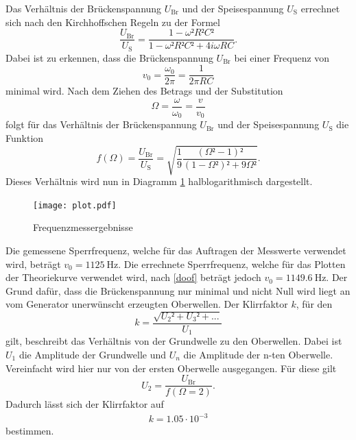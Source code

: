 Das Verhältnis der Brückenspannung $U_{\text{Br}}$ und der Speisespannung $U_{\text{S}}$ errechnet sich nach den Kirchhoffschen Regeln zu der Formel
\begin{equation}
  \frac{U_{\text{Br}}}{U_{\text{S}}} = \frac{1-\omega²R²C²}{1-\omega²R²C²+4i\omega RC}.
\end{equation}
Dabei ist zu erkennen, dass die Brückenspannung $U_{\text{Br}}$ bei einer Frequenz von
\begin{equation}
  v_0 = \frac{\omega_0}{2 \pi} =\frac{1}{2 \pi RC} \label{doof}
\end{equation}
minimal wird.
Nach dem Ziehen des Betrags und der Substitution
\begin{equation}
  \Omega = \frac{\omega}{\omega_0} = \frac{v}{v_0}
\end{equation}
folgt für das Verhältnis der Brückenspannung $U_{\text{Br}}$ und der Speisespannung $U_{\text{S}}$ die Funktion
\begin{equation}
  f(\Omega) = \frac{U_{\text{Br}}}{U_{\text{S}}} = \sqrt{\frac{1}{9} \frac{\left(\Omega²-1 \right)²}{\left(1-\Omega² \right)²+9\Omega²}}.
\end{equation}
Dieses Verhältnis wird nun in Diagramm \ref{fig:6} halblogarithmisch dargestellt.

\begin{figure}[H]
  \centering
  \texttt{[image: plot.pdf]}
  \caption{Frequenzmessergebnisse}
  \label{fig:6}
\end{figure}

Die gemessene Sperrfrequenz, welche für das Auftragen der Messwerte verwendet wird, beträgt $v_0 = \SI{1125}{\hertz}$.
Die errechnete Sperrfrequenz, welche für das Plotten der Theoriekurve verwendet wird, nach \ref{doof} beträgt jedoch $v_0 = \SI{1149.6}{\hertz}$.
Der Grund dafür, dass die Brückenspannung nur minimal und nicht Null wird liegt an vom Generator unerwünscht erzeugten Oberwellen.
Der Klirrfaktor $k$, für den
\begin{equation}
    k = \frac{\sqrt{U_2²+U_3²+...}}{U_1}
\end{equation}
gilt, beschreibt das Verhältnis von der Grundwelle zu den Oberwellen.
Dabei ist $U_1$ die Amplitude der Grundwelle und $U_{n}$ die Amplitude der n-ten Oberwelle.
Vereinfacht wird hier nur von der ersten Oberwelle ausgegangen.
Für diese gilt
\begin{equation}
  U_2 = \frac{U_{\text{Br}}}{f(\Omega = 2)}.
\end{equation}
Dadurch lässt sich der Klirrfaktor auf
\begin{align}
  k = 1.05 \cdot 10^{-3}
\end{align}
bestimmen.
